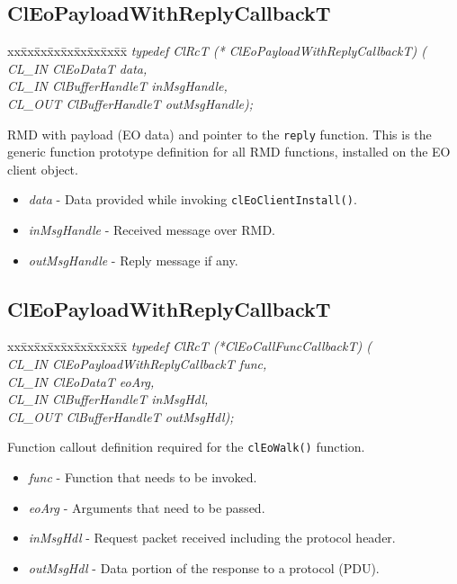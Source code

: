 \begin{flushleft}
\subsection{ClEoPayloadWithReplyCallbackT}
\begin{tabbing}
xx\=xx\=xx\=xx\=xx\=xx\=xx\=xx\=xx\=\kill
\textit{typedef ClRcT (* ClEoPayloadWithReplyCallbackT) (}\\
\>\>\>\textit{CL\_IN   ClEoDataT data,}\\
\>\>\>\textit{CL\_IN   ClBufferHandleT  inMsgHandle,}\\
\>\>\>\textit{CL\_OUT  ClBufferHandleT  outMsgHandle);}
\end{tabbing}
RMD with payload (EO data) and pointer to the {\tt{reply}} function. This is the generic function
 prototype definition for all RMD functions, installed on the EO client object.
 \begin{itemize}
 \item
 \textit{data} - Data provided while invoking {\tt{clEoClientInstall()}}.
 \item
 \textit{inMsgHandle} - Received message over RMD.
 \item
 \textit{outMsgHandle} - Reply message if any.
 \end{itemize}
 
 
 \subsection{ClEoPayloadWithReplyCallbackT}
 \begin{tabbing}
 xx\=xx\=xx\=xx\=xx\=xx\=xx\=xx\=xx\=\kill
\textit{ typedef ClRcT (*ClEoCallFuncCallbackT) (}\\
\>\>\>\textit{CL\_IN ClEoPayloadWithReplyCallbackT func,}\\
\>\>\>\textit{CL\_IN   ClEoDataT                   eoArg,}\\
\>\>\>\textit{CL\_IN   ClBufferHandleT      inMsgHdl,}\\
\>\>\>\textit{CL\_OUT  ClBufferHandleT      outMsgHdl);}\end{tabbing}
 Function callout definition required for the {\tt{clEoWalk()}} function.
\begin{itemize}
\item
\textit{func} - Function that needs to be invoked.
\item
\textit{eoArg} - Arguments that need to be passed.
\item
\textit{inMsgHdl} - Request packet received including the protocol header.
\item
\textit{outMsgHdl} - Data portion of the response to a protocol (PDU).
\end{itemize}


\end{flushleft}

